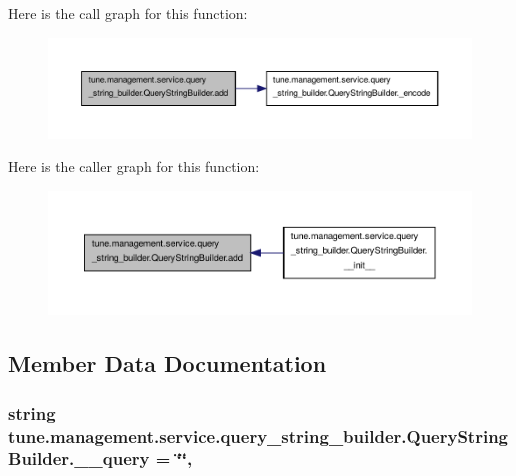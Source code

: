 Here is the call graph for this function\-:
\nopagebreak
\begin{figure}[H]
\begin{center}
\leavevmode
\includegraphics[width=350pt]{classtune_1_1management_1_1service_1_1query__string__builder_1_1QueryStringBuilder_a52936a3c60cbe5dc990ece2561c4d69e_cgraph}
\end{center}
\end{figure}




Here is the caller graph for this function\-:
\nopagebreak
\begin{figure}[H]
\begin{center}
\leavevmode
\includegraphics[width=350pt]{classtune_1_1management_1_1service_1_1query__string__builder_1_1QueryStringBuilder_a52936a3c60cbe5dc990ece2561c4d69e_icgraph}
\end{center}
\end{figure}




\subsection{Member Data Documentation}
\hypertarget{classtune_1_1management_1_1service_1_1query__string__builder_1_1QueryStringBuilder_a51080f1efb7e53b5df7c2ee223f73660}{
\subsubsection[{\-\_\-\-\_\-query}]{\setlength{\rightskip}{0pt plus 5cm}string tune.\-management.\-service.\-query\-\_\-string\-\_\-builder.\-Query\-String\-Builder.\-\_\-\-\_\-query = \char`\"{}\char`\"{}\hspace{0.3cm}{\ttfamily [static]}, {\ttfamily [private]}}}\label{classtune_1_1management_1_1service_1_1query__string__builder_1_1QueryStringBuilder_a51080f1efb7e53b5df7c2ee223f73660}


